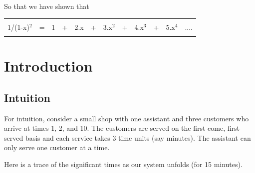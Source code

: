 \documentclass[12pt,fleqn]{report}
\begin{document}
\noindent
So that we have shown that

\begin{table}[hbt]\centering
\begin{tabular}{||r cc cc cc cc ccc||}
\hline
&&&&&&&&&&&\\
\hspace*{0.25in}
1/(1-x)$^2$
  & = & 
       1 & + & 2.x & + & 3.x$^2$ & + & 4.x$^3$ & + & 5.x$^4$ & .... 
\hspace*{0.25in}\\
&&&&&&&&&&&\\
\hline
\end{tabular}
\end{table}

\newpage

\section{Introduction}

\subsection{Intuition}

For intuition, consider a small shop with one assistant
and three customers who arrive at times 1, 2, and 10.
The customers are served on the first-come, first-served basis
and each service takes 3 time units (say minutes).
The assistant can only serve one customer at a time.

Here is a trace of the significant times as our system unfolds
(for 15 minutes).
\end{document}
